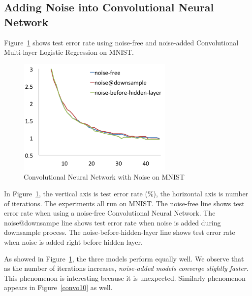 \subsection{Adding Noise into Convolutional Neural Network}
Figure~\ref{convo} shows test error rate using noise-free and noise-added
Convolutional Multi-layer Logistic Regression on MNIST.
\begin{figure}[!htbp]
\centering
\includegraphics[width=215pt]{f-figs/convo.png}
\caption{Convolutional Neural Network with Noise on MNIST}
\label{convo}
\end{figure}
In Figure~\ref{convo}, the vertical axis is test error rate (\%), the
horizontal axis is number of iterations. The experiments all run on MNIST.
The noise-free line shows test error rate when using a noise-free
Convolutional Neural Network. The noise@downsampe line shows test error
rate when noise is added during downsample process. The noise-before-hidden-layer line shows test error rate when noise is added right before hidden layer.

As showed in Figure~\ref{convo}, the three models perform equally well.
We observe that as the number of iterations increases, {\em noise-added
models converge slightly faster}. This phenomenon is interesting because it is unexpected.
Similarly phenomenon appears in Figure~\ref{convo10} as well.


